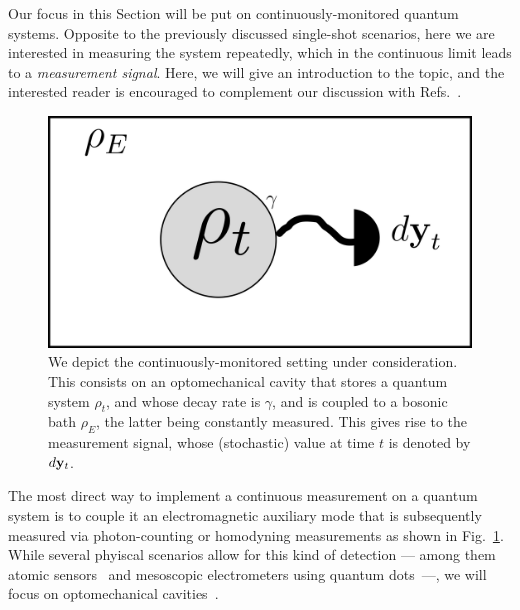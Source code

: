 Our focus in this Section will be put on continuously-monitored quantum systems. Opposite to the previously discussed single-shot scenarios, here we are interested in measuring the system repeatedly, which in the continuous limit leads to a \textit{measurement signal}. Here, we will give an introduction to the topic, and the interested reader is encouraged to complement our discussion with Refs.~\cite{wisemanbook,jacobs_2014,gardiner1985input, doherty1999feedback,wiseman1993interpretation}.

\begin{figure}[t!]
    \centering
    \includegraphics[width=1.\textwidth]{Figures/CMON/INTRO/cmon_esquema.png}
    \caption{We depict the continuously-monitored setting under consideration. This consists on an optomechanical cavity that stores a quantum system $\rho_t$, and whose decay rate is $\gamma$, and is coupled to a bosonic bath $\rho_E$, the latter being constantly measured. This gives rise to the measurement signal, whose (stochastic) value at time $t$ is denoted by $d\mathbf{y}_t$.}
    \label{fig:cmon_scheme}
\end{figure}

The most direct way to implement a continuous measurement on a quantum system is to couple it an electromagnetic auxiliary mode that is subsequently measured via photon-counting or homodyning measurements as shown in Fig.~\ref{fig:cmon_scheme}. While several phyiscal scenarios allow for this kind of detection --- among them atomic sensors~\cite{Jimenez2018signal} and mesoscopic electrometers using quantum dots~\cite{Lu2003}---, we will focus on optomechanical cavities~\cite{Aspelmayer2014cavity}.

